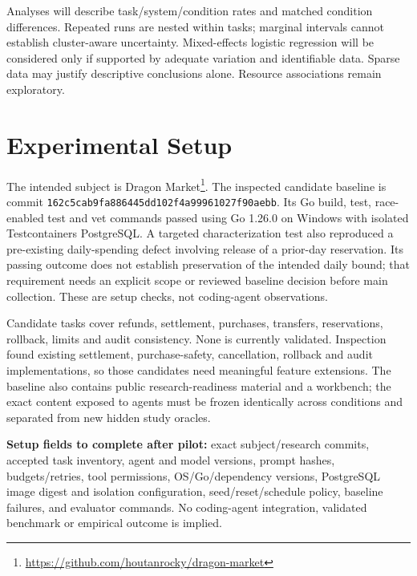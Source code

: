 Analyses will describe task/system/condition rates and matched condition differences. Repeated runs
are nested within tasks; marginal intervals cannot establish cluster-aware uncertainty. Mixed-effects
logistic regression will be considered only if supported by adequate variation and identifiable data.
Sparse data may justify descriptive conclusions alone. Resource associations remain exploratory.

\section{Experimental Setup}
The intended subject is Dragon Market\footnote{\url{https://github.com/houtanrocky/dragon-market}}.
The inspected candidate baseline is commit
\texttt{162c5cab9fa886445dd102f4a99961027f90aebb}. Its Go build, test, race-enabled test and vet
commands passed using Go 1.26.0 on Windows with isolated Testcontainers PostgreSQL. A targeted
characterization test also reproduced a pre-existing daily-spending defect involving release of a
prior-day reservation. Its passing outcome does not establish preservation of the intended daily bound;
that requirement needs an explicit scope or reviewed baseline decision before main collection.
These are setup checks, not coding-agent observations.

Candidate tasks cover refunds, settlement, purchases, transfers, reservations, rollback, limits and
audit consistency. None is currently validated. Inspection found existing settlement, purchase-safety,
cancellation, rollback and audit implementations, so those candidates need meaningful feature extensions.
The baseline also contains public research-readiness material and a workbench; the exact content exposed
to agents must be frozen identically across conditions and separated from new hidden study oracles.

\textbf{Setup fields to complete after pilot:} exact subject/research commits, accepted task inventory,
agent and model versions, prompt hashes, budgets/retries, tool permissions, OS/Go/dependency versions,
PostgreSQL image digest and isolation configuration, seed/reset/schedule policy, baseline failures,
and evaluator commands. No coding-agent integration, validated benchmark or empirical outcome is implied.
